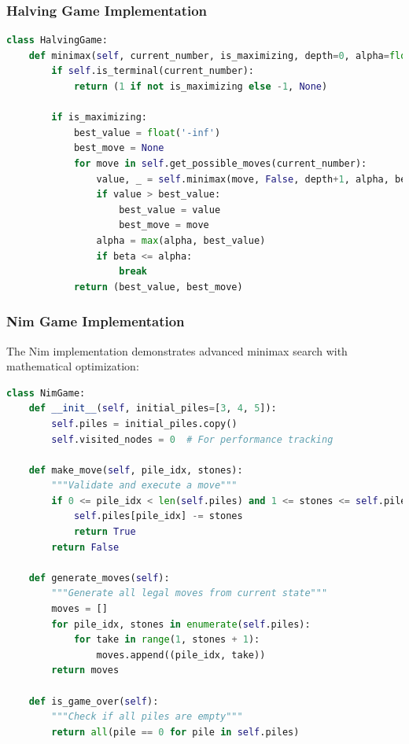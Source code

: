 \documentclass[12pt]{article}
\begin{document}
\subsubsection{Halving Game Implementation}

\begin{lstlisting}[language=Python, basicstyle=\small]
class HalvingGame:
    def minimax(self, current_number, is_maximizing, depth=0, alpha=float('-inf'), beta=float('inf')):
        if self.is_terminal(current_number):
            return (1 if not is_maximizing else -1, None)
        
        if is_maximizing:
            best_value = float('-inf')
            best_move = None
            for move in self.get_possible_moves(current_number):
                value, _ = self.minimax(move, False, depth+1, alpha, beta)
                if value > best_value:
                    best_value = value
                    best_move = move
                alpha = max(alpha, best_value)
                if beta <= alpha:
                    break
            return (best_value, best_move)
\end{lstlisting}

\subsubsection{Nim Game Implementation}

The Nim implementation demonstrates advanced minimax search with mathematical optimization:

\begin{lstlisting}[language=Python, basicstyle=\small]
class NimGame:
    def __init__(self, initial_piles=[3, 4, 5]):
        self.piles = initial_piles.copy()
        self.visited_nodes = 0  # For performance tracking
        
    def make_move(self, pile_idx, stones):
        """Validate and execute a move"""
        if 0 <= pile_idx < len(self.piles) and 1 <= stones <= self.piles[pile_idx]:
            self.piles[pile_idx] -= stones
            return True
        return False
    
    def generate_moves(self):
        """Generate all legal moves from current state"""
        moves = []
        for pile_idx, stones in enumerate(self.piles):
            for take in range(1, stones + 1):
                moves.append((pile_idx, take))
        return moves
    
    def is_game_over(self):
        """Check if all piles are empty"""
        return all(pile == 0 for pile in self.piles)
\end{lstlisting}
\end{document}
